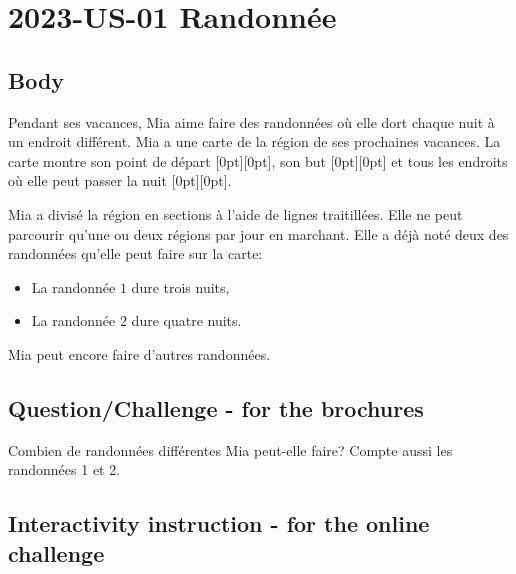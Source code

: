 \documentclass[a4paper,11pt]{report}
\newcommand{\taskGraphicsFolder}{..}
\begin{document}
\section*{\centering{} 2023-US-01 Randonnée}


\subsection*{Body}

Pendant ses vacances, Mia aime faire des randonnées où elle dort chaque nuit à un endroit différent. Mia a une carte de la région de ses prochaines vacances. La carte montre son point de départ \raisebox{-0.5ex}[0pt][0pt]{}, son but \raisebox{-0.5ex}[0pt][0pt]{} et tous les endroits où elle peut passer la nuit \raisebox{-0.5ex}[0pt][0pt]{}.

{\centering%
\par}

Mia a divisé la région en sections à l’aide de lignes traitillées. Elle ne peut parcourir qu’une ou deux régions par jour en marchant. Elle a déjà noté deux des randonnées qu’elle peut faire sur la carte:

\begin{itemize}
  \item La randonnée $1$ dure trois nuits,
  \item La randonnée $2$ dure quatre nuits.
\end{itemize}

Mia peut encore faire d’autres randonnées.

{\em


\subsection*{Question/Challenge - for the brochures}

Combien de randonnées différentes Mia peut-elle faire? Compte aussi les randonnées 1 et 2.

}


\subsection*{Interactivity instruction - for the online challenge}
\end{document}
